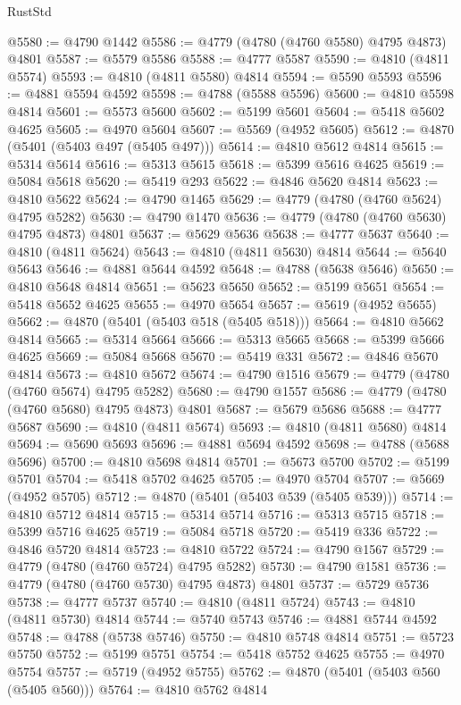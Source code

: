 \begin{lexlean}{RustStd}
\begin{coremodule}
@5580 := @4790 @1442
@5586 := @4779 (@4780 (@4760 @5580) @4795 @4873) @4801
@5587 := @5579 @5586
@5588 := @4777 @5587
@5590 := @4810 (@4811 @5574)
@5593 := @4810 (@4811 @5580) @4814
@5594 := @5590 @5593
@5596 := @4881 @5594 @4592
@5598 := @4788 (@5588 @5596)
@5600 := @4810 @5598 @4814
@5601 := @5573 @5600
@5602 := @5199 @5601
@5604 := @5418 @5602 @4625
@5605 := @4970 @5604
@5607 := @5569 (@4952 @5605)
@5612 := @4870 (@5401 (@5403 @497 (@5405 @497)))
@5614 := @4810 @5612 @4814
@5615 := @5314 @5614
@5616 := @5313 @5615
@5618 := @5399 @5616 @4625
@5619 := @5084 @5618
@5620 := @5419 @293
@5622 := @4846 @5620 @4814
@5623 := @4810 @5622
@5624 := @4790 @1465
@5629 := @4779 (@4780 (@4760 @5624) @4795 @5282)
@5630 := @4790 @1470
@5636 := @4779 (@4780 (@4760 @5630) @4795 @4873) @4801
@5637 := @5629 @5636
@5638 := @4777 @5637
@5640 := @4810 (@4811 @5624)
@5643 := @4810 (@4811 @5630) @4814
@5644 := @5640 @5643
@5646 := @4881 @5644 @4592
@5648 := @4788 (@5638 @5646)
@5650 := @4810 @5648 @4814
@5651 := @5623 @5650
@5652 := @5199 @5651
@5654 := @5418 @5652 @4625
@5655 := @4970 @5654
@5657 := @5619 (@4952 @5655)
@5662 := @4870 (@5401 (@5403 @518 (@5405 @518)))
@5664 := @4810 @5662 @4814
@5665 := @5314 @5664
@5666 := @5313 @5665
@5668 := @5399 @5666 @4625
@5669 := @5084 @5668
@5670 := @5419 @331
@5672 := @4846 @5670 @4814
@5673 := @4810 @5672
@5674 := @4790 @1516
@5679 := @4779 (@4780 (@4760 @5674) @4795 @5282)
@5680 := @4790 @1557
@5686 := @4779 (@4780 (@4760 @5680) @4795 @4873) @4801
@5687 := @5679 @5686
@5688 := @4777 @5687
@5690 := @4810 (@4811 @5674)
@5693 := @4810 (@4811 @5680) @4814
@5694 := @5690 @5693
@5696 := @4881 @5694 @4592
@5698 := @4788 (@5688 @5696)
@5700 := @4810 @5698 @4814
@5701 := @5673 @5700
@5702 := @5199 @5701
@5704 := @5418 @5702 @4625
@5705 := @4970 @5704
@5707 := @5669 (@4952 @5705)
@5712 := @4870 (@5401 (@5403 @539 (@5405 @539)))
@5714 := @4810 @5712 @4814
@5715 := @5314 @5714
@5716 := @5313 @5715
@5718 := @5399 @5716 @4625
@5719 := @5084 @5718
@5720 := @5419 @336
@5722 := @4846 @5720 @4814
@5723 := @4810 @5722
@5724 := @4790 @1567
@5729 := @4779 (@4780 (@4760 @5724) @4795 @5282)
@5730 := @4790 @1581
@5736 := @4779 (@4780 (@4760 @5730) @4795 @4873) @4801
@5737 := @5729 @5736
@5738 := @4777 @5737
@5740 := @4810 (@4811 @5724)
@5743 := @4810 (@4811 @5730) @4814
@5744 := @5740 @5743
@5746 := @4881 @5744 @4592
@5748 := @4788 (@5738 @5746)
@5750 := @4810 @5748 @4814
@5751 := @5723 @5750
@5752 := @5199 @5751
@5754 := @5418 @5752 @4625
@5755 := @4970 @5754
@5757 := @5719 (@4952 @5755)
@5762 := @4870 (@5401 (@5403 @560 (@5405 @560)))
@5764 := @4810 @5762 @4814

\end{coremodule}
\end{lexlean}
